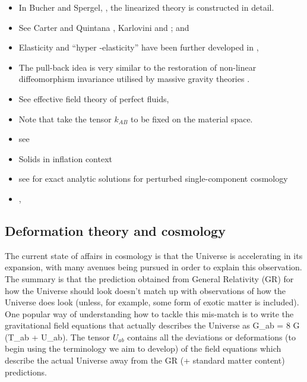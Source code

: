 

\begin{itemize}
\item In Bucher and Spergel, \cite{Bucher:1998mh}, the linearized theory is constructed in detail.
\item See Carter and Quintana \cite{Carter21111972, Carter:1977qf}, Karlovini \cite{Karlovini:2002fc, Karlovini:2003xi, Karlovini:2004gq, Karlovini:2007ut} and \cite{Beig:2002pk, Frauendiener:2007yx, Brito:2009jj, Pourtsidou:2013nha}; \cite{Battye:2005ik}
\cite{Balthazar:2014oza} and \cite{Dubovsky:2011sj}
\item Elasticity and ``hyper -elasticity'' have been further developed in \cite{Carter:1982xm}, \cite{Carter:2006cw}
\item The pull-back idea is very similar to the restoration of non-linear diffeomorphism invariance utilised by massive gravity theories \cite{deRham:2014zqa}.
\item See effective field theory of perfect fluids, \cite{Ballesteros:2012kv}
\item Note that \cite{Karlovini:2002fc} take the tensor $k_{AB}$ to be fixed on the material space.
\item see \cite{Bel:1996pb} \cite{Polak:2007dm}
\item Solids in inflation context \cite{Gruzinov:2004ty, Endlich:2012pz, Bartolo:2014xfa}
\item see \cite{Skovran:2014dka} for exact analytic solutions for perturbed single-component cosmology 
\item \cite{Frauendiener:2007yx}, \cite{Kijowski:1994eq}
\end{itemize}

\subsection{Deformation theory and cosmology}
The current state of affairs in cosmology is that the Universe is accelerating in its expansion, with many avenues being pursued in order to explain this observation. The summary is that the prediction obtained from General Relativity (GR) for how the Universe should look doesn't match up with observations of how the Universe does look (unless, for example, some form of exotic matter is included). One popular way of understanding how to tackle this mis-match is to write the gravitational field equations that actually describes the Universe as
\bea
G_{ab} = 8 \pi G \left(T_{ab} + U_{ab}\right).
\eea
The tensor $U_{ab}$ contains all the deviations or deformations (to begin using the terminology we aim to develop) of the field equations which describe the actual Universe away from the GR (+ standard matter content) predictions. 

